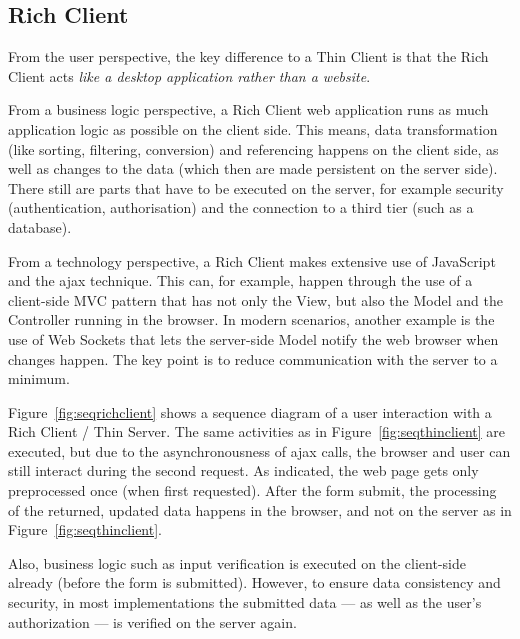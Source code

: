 \subsection{Rich Client}
From the user perspective, the key difference to a Thin Client is that the Rich Client acts \emph{like a desktop application rather than a website}.

From a business logic perspective, a Rich Client web application runs as much application logic as possible on the client side. This means, data transformation (like sorting, filtering, conversion) and referencing happens on the client side, as well as changes to the data (which then are made persistent on the server side). There still are parts that have to be executed on the server, for example security (authentication, authorisation) and the connection to a third tier (such as a database).

From a technology perspective, a Rich Client makes extensive use of JavaScript and the \ac{ajax} technique.
This can, for example, happen through the use of a client-side MVC pattern that has not only the View, but also the Model and the Controller running in the browser. In modern scenarios, another example is the use of Web Sockets that lets the server-side Model notify the web browser when changes happen. The key point is to reduce communication with the server to a minimum.

Figure~\ref{fig:seqrichclient} shows a sequence diagram of a user interaction with a Rich Client / Thin Server. The same activities as in Figure~\ref{fig:seqthinclient} are executed, but due to the asynchronousness of \ac{ajax} calls, the browser and user can still interact during the second request. As indicated, the web page gets only preprocessed once (when first requested). After the form submit, the processing of the returned, updated data happens in the browser, and not on the server as in Figure~\ref{fig:seqthinclient}.

Also, business logic such as input verification is executed on the client-side already (before the form is submitted). However, to ensure data consistency and security, in most implementations the submitted data --- as well as the user's authorization --- is verified on the server again.

